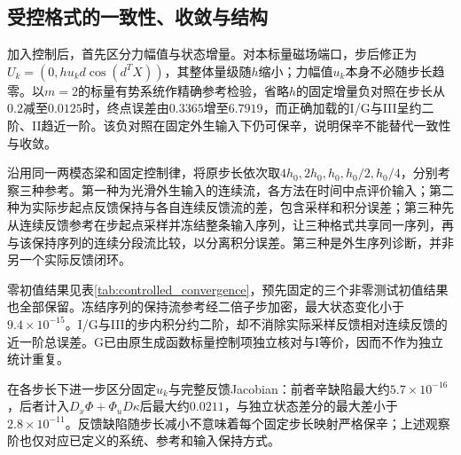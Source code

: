 \subsection{受控格式的一致性、收敛与结构}
\label{sec:controlled_convergence}

加入控制后，首先区分力幅值与状态增量。对本标量磁场端口，步后修正为$U_k=(0,h u_kd\cos(d^TX))$，其整体量级随$h$缩小；力幅值$u_k$本身不必随步长趋零。以$m=2$的标量有势系统作精确参考检验，省略$h$的固定增量负对照在步长从$0.2$减至$0.0125$时，终点误差由$0.3365$增至$6.7919$，而正确加载的I/G与III呈约二阶、II趋近一阶。该负对照在固定外生输入下仍可保辛，说明保辛不能替代一致性与收敛。

沿用同一两模态梁和固定控制律，将原步长依次取$4h_0,2h_0,h_0,h_0/2,h_0/4$，分别考察三种参考。第一种为光滑外生输入的连续流，各方法在时间中点评价输入；第二种为实际步起点反馈保持与各自连续反馈流的差，包含采样和积分误差；第三种先从连续反馈参考在步起点采样并冻结整条输入序列，让三种格式共享同一序列，再与该保持序列的连续分段流比较，以分离积分误差。第三种是外生序列诊断，并非另一个实际反馈闭环。



零初值结果见表\ref{tab:controlled_convergence}，预先固定的三个非零测试初值结果也全部保留。冻结序列的保持流参考经二倍子步加密，最大状态变化小于$9.4\times10^{-15}$。I/G与III的步内积分约二阶，却不消除实际采样反馈相对连续反馈的近一阶总误差。G已由原生成函数标量控制项独立核对与I等价，因而不作为独立统计重复。

在各步长下进一步区分固定$u_k$与完整反馈Jacobian：前者辛缺陷最大约$5.7\times10^{-16}$，后者计入$D_x\Phi+\Phi_uD\kappa$后最大约$0.0211$，与独立状态差分的最大差小于$2.8\times10^{-11}$。反馈缺陷随步长减小不意味着每个固定步长映射严格保辛；上述观察阶也仅对应已定义的系统、参考和输入保持方式。
